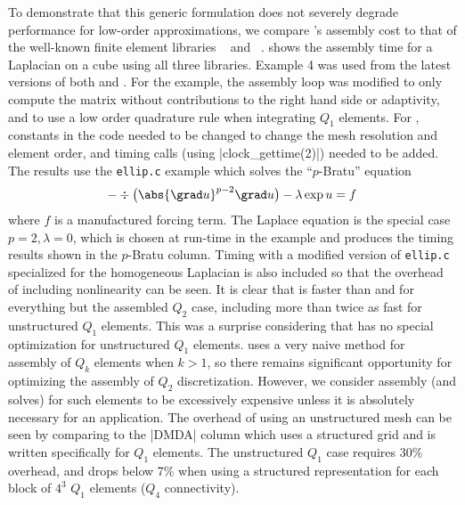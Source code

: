 To demonstrate that this generic formulation does not severely degrade performance for low-order approximations, we compare \Dohp's assembly cost to that of the well-known finite element libraries {\libmesh}~\citep{libmesh} and {\dealii}~\citep{bangerth2007deal}.
 shows the assembly time for a Laplacian on a cube using all three libraries.
Example 4 was used from the latest versions of both {\libmesh} and {\dealii}.
For the {\libmesh} example, the assembly loop was modified to only compute the matrix without contributions to the right hand side or adaptivity, and to use a low order quadrature rule when integrating $Q_1$ elements.
For \dealii, constants in the code needed to be changed to change the mesh resolution and element order, and timing calls (using \cverb|clock_gettime(2)|) needed to be added.
The {\Dohp} results use the \verb|ellip.c| example which solves the ``$p$-Bratu'' equation
\begin{align*}
  -\div \big(\abs{\grad u}^{p-2} \grad u \big) - \lambda \exp u = f
\end{align*}
where $f$ is a manufactured forcing term.
The Laplace equation is the special case $p=2, \lambda=0$, which is chosen at run-time in the example and produces the timing results shown in the $p$-Bratu column.
Timing with a modified version of \verb|ellip.c| specialized for the homogeneous Laplacian is also included so that the overhead of including nonlinearity can be seen.
It is clear that {\Dohp} is faster than {\libmesh} and {\dealii} for everything but the assembled $Q_2$ case, including more than twice as fast for unstructured $Q_1$ elements.
This was a surprise considering that {\Dohp} has no special optimization for unstructured $Q_1$ elements.
{\Dohp} uses a very naive method for assembly of $Q_k$ elements when $k>1$, so there remains significant opportunity for optimizing the assembly of $Q_2$ discretization.
However, we consider assembly (and solves) for such elements to be excessively expensive unless it is absolutely necessary for an application.
The overhead of using an unstructured mesh can be seen by comparing to the \cverb|DMDA| column which uses a structured grid and is written specifically for $Q_1$ elements.
The unstructured $Q_1$ case requires 30\% overhead, and drops below 7\% when using a structured representation for each block of $4^3$ $Q_1$ elements ($Q_4$ connectivity).


